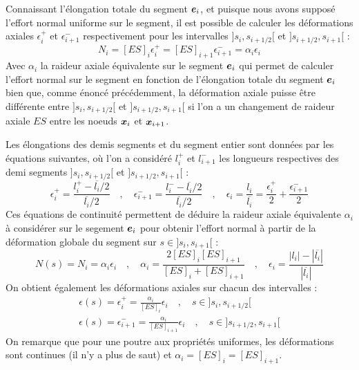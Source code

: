 Connaissant l'élongation totale du segment $\boldsymbol{e}_i$, et puisque nous avons supposé l'effort normal uniforme sur le segment, il est possible de calculer les déformations axiales $\epsilon_{i}^{+}$ et $\epsilon_{i+1}^{-}$ respectivement pour les intervalles $]s_i,s_{i+1/2}[$ et $]s_{i+1/2},s_{i+1}[$ :
\begin{equation}
	N_i = [ES]_{i} \epsilon_{i}^{+}
	= [ES]_{i+1} \epsilon_{i+1}^{-}
	= \alpha_i \epsilon_i
\end{equation}
Avec $\alpha_i$ la raideur axiale équivalente sur le segment $\boldsymbol{e}_i$ qui permet de calculer l'effort normal sur le segment en fonction de l'élongation totale du segment $\boldsymbol{e}_i$ bien que, comme énoncé précédemment, la déformation axiale puisse être différente entre $]s_i,s_{i+1/2}[$ et $]s_{i+1/2},s_{i+1}[$ si l'on a un changement de raideur axiale $ES$ entre les noeuds $\boldsymbol{x}_i$ et $\boldsymbol{x}_{i+1}$.

Les élongations des demis segments et du segment entier sont données par les équations suivantes, où l'on a considéré $l_i^+$ et $l_{i+1}^-$ les longueurs respectives des demi segments $]s_i,s_{i+1/2}[$ et $]s_{i+1/2},s_{i+1}[$ :
\begin{equation}
	\epsilon_{i}^{+} = \frac{l_i^+ - \overbar{l_i}/2}{\overbar{l_i}/2} \quad , \quad
	\epsilon_{i+1}^{-} = \frac{l_i^- - \overbar{l_i}/2}{\overbar{l_i}/2} \quad , \quad
	\epsilon_i = \frac{l_i}{\overbar{l_i}} = \frac{\epsilon_{i}^{+}}{2} + \frac{\epsilon_{i+1}^{-}}{2}
\end{equation}
Ces équations de continuité permettent de déduire la raideur axiale équivalente $\alpha_i$ à considérer sur le segement $\boldsymbol{e}_i$ pour obtenir l'effort normal à partir de la déformation globale du segment sur $s \in ]s_i,s_{i+1}[$ :
 \begin{equation}
	N(s) = N_i = \alpha_i\epsilon_i
	\quad , \quad
	\alpha_i = \frac{2 [ES]_i [ES]_{i+1}}{[ES]_i + [ES]_{i+1}}
	\quad , \quad
	\epsilon_i = \frac{|l_i| - |\overbar{l_i}|}{|\overbar{l_i}|}
\end{equation}
On obtient également les déformations axiales sur chacun des intervalles :
\begin{subequations}
	\begin{gather}
		\epsilon(s) = \epsilon_{i}^{+} = \frac{\alpha_i}{[ES]_i}\epsilon_i \quad , \quad s \in ]s_i,s_{i+1/2}[ \\
		\epsilon(s) = \epsilon_{i+1}^{-} = \frac{\alpha_i}{[ES]_{i+1}}\epsilon_i \quad , \quad s \in ]s_{i+1/2},s_{i+1}[
	\end{gather}
\end{subequations}
On remarque que pour une poutre aux propriétés uniformes, les déformations sont continues (il n'y a plus de saut) et $\alpha_i = [ES]_i = [ES]_{i+1}$.

